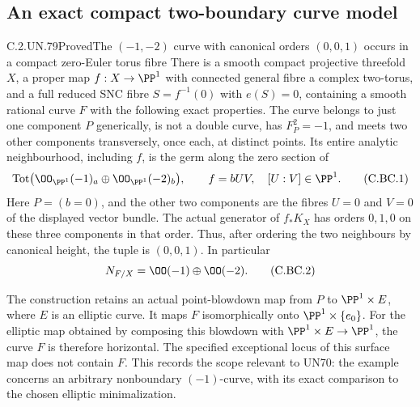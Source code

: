 \subsection{An exact compact two-boundary curve model}

\begin{statement}{C.2.UN.79}{Proved}{The \((-1,-2)\) curve with canonical orders \((0,0,1)\) occurs in a compact zero-Euler torus fibre}
There is a smooth compact projective threefold \(X\), a proper map
\(f:X\to\PP^1\) with connected general fibre a complex two-torus,
and a full reduced SNC fibre \(S=f^{-1}(0)\) with \(e(S)=0\),
containing a smooth rational curve \(F\) with the following exact
properties. The curve belongs to just one component \(P\) generically,
is not a double curve, has \(F_P^2=-1\), and meets two other
components transversely, once each, at distinct points. Its entire
analytic neighbourhood, including \(f\), is the germ along the zero
section of
\[
 \operatorname{Tot}\bigl(\OO_{\PP^1}(-1)_a
                 \oplus\OO_{\PP^1}(-2)_b\bigr),\qquad
 f=bUV,\quad [U:V]\in\PP^1.                         \tag{C.BC.1}
\]
Here \(P=(b=0)\), and the other two components are the fibres
\(U=0\) and \(V=0\) of the displayed vector bundle.
The actual generator of \(f_*K_X\) has orders \(0,1,0\)
on these three components in that order. Thus, after ordering the
two neighbours by canonical height, the tuple is \((0,0,1)\).
In particular
\[
                    N_{F/X}=\OO(-1)\oplus\OO(-2).            \tag{C.BC.2}
\]

The construction retains an actual point-blowdown map from \(P\)
to \(\PP^1\times E\), where \(E\) is an elliptic curve.
It maps \(F\) isomorphically onto \(\PP^1\times\{e_0\}\).
For the elliptic map obtained by composing this blowdown with
\(\PP^1\times E\to\PP^1\), the curve \(F\) is therefore
horizontal. The specified exceptional locus of this surface map
does not contain \(F\). This records the scope relevant to UN70:
the example concerns an arbitrary nonboundary \((-1)\)-curve,
with its exact comparison to the chosen elliptic minimalization.
\end{statement}

